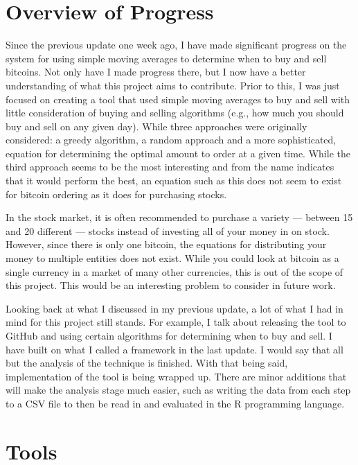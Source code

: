 



\MYTITLE{}
\MYHEADERS{}
\PLEDGE{}


\section{Overview of Progress}

Since the previous update one week ago, I have made significant progress on the system for using simple
moving averages to determine when to buy and sell bitcoins. Not only have I made progress there, but
I now have a better understanding of what this project aims to contribute. Prior to this, I was just
focused on creating a tool that used simple moving averages to buy and sell with little consideration
of buying and selling algorithms (e.g., how much you should buy and sell on any given day). While
three approaches were originally considered: a greedy algorithm, a random approach and a more sophisticated,
equation for determining the optimal amount to order at a given time. While the third approach seems
to be the most interesting and from the name indicates that it would perform the best, an equation
such as this does not seem to exist for bitcoin ordering as it does for purchasing stocks.

In the stock market, it is often recommended to purchase a variety --- between 15 and 20 different ---
stocks instead of investing all of your money in on stock. However, since there is only one bitcoin,
the equations for distributing your money to multiple entities does not exist. While you could look
at bitcoin as a single currency in a market of many other currencies, this is out of the scope of this
project. This would be an interesting problem to consider in future work.

Looking back at what I discussed in my previous update, a lot of what I had in mind for this project
still stands. For example, I talk about releasing the tool to GitHub and using certain algorithms for
determining when to buy and sell. I have built on what I called a framework in the last update. I would
say that all but the analysis of the technique is finished. With that being said, implementation of
the tool is being wrapped up. There are minor additions that will make the analysis stage much easier,
such as writing the data from each step to a CSV file to then be read in and evaluated in the R programming
language.

\section{Tools}


